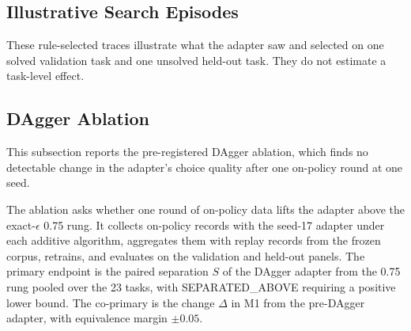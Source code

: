 \subsection{Illustrative Search Episodes}
\label{app:qualitative}
These rule-selected traces illustrate what the adapter saw and selected on one solved validation task and one unsolved held-out task. They do not estimate a task-level effect.

\clearpage

\subsection{DAgger Ablation}
\label{app:results-cf-dagger}

This subsection reports the pre-registered DAgger ablation, which finds no detectable change in the adapter's choice quality after one on-policy round at one seed.

The ablation asks whether one round of on-policy data lifts the adapter above the exact-$\epsilon$ 0.75 rung. It collects on-policy records with the seed-17 adapter under each additive algorithm, aggregates them with replay records from the frozen corpus, retrains, and evaluates on the validation and held-out panels. The primary endpoint is the paired separation $S$ of the DAgger adapter from the 0.75 rung pooled over the 23 tasks, with SEPARATED\_ABOVE requiring a positive lower bound. The co-primary is the change $\Delta$ in M1 from the pre-DAgger adapter, with equivalence margin $\pm 0.05$.

